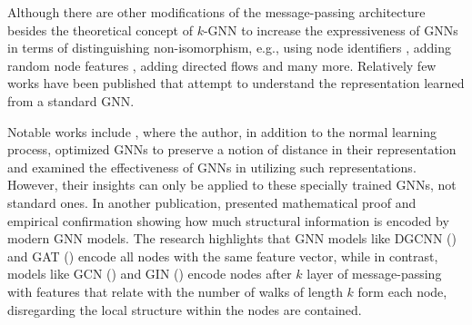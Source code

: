 Although there are other modifications of the message-passing architecture besides the theoretical concept of $k$-GNN to increase the expressiveness of GNNs in terms of distinguishing non-isomorphism, e.g., using node identifiers \cite{Vignac2020}, adding random node features \cite{Sato2021,Abboud2020}, adding directed flows \cite{Beaini2021} and many more. Relatively few works have been published that attempt to understand the representation learned from a standard GNN.

Notable works include \cite{Nikolentzos2023weisfeiler}, where the author, in addition to the normal learning process, optimized GNNs to preserve a notion of distance in their representation and examined the effectiveness of GNNs in utilizing such representations. However, their insights can only be applied to these specially trained GNNs, not standard ones. In another publication, \cite{Nikolentzos2023} presented mathematical proof and empirical confirmation showing how much structural information is encoded by modern GNN models. The research highlights that GNN models like DGCNN (\cite{Zhang2018}) and GAT (\cite{Velivckovic2017}) encode all nodes with the same feature vector, while in contrast, models like GCN (\cite{Kip+2017}) and GIN (\cite{Xu2018}) encode nodes after $k$ layer of message-passing with features that relate with the number of walks of length $k$ form each node, disregarding the local structure within the nodes are contained.